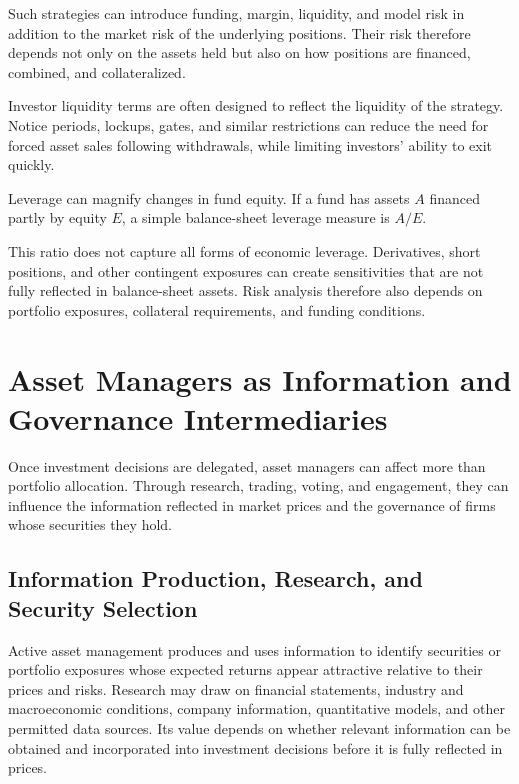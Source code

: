 Such strategies can introduce funding, margin, liquidity, and model risk in addition to the market risk of the underlying positions. Their risk therefore depends not only on the assets held but also on how positions are financed, combined, and collateralized.

Investor liquidity terms are often designed to reflect the liquidity of the strategy. Notice periods, lockups, gates, and similar restrictions can reduce the need for forced asset sales following withdrawals, while limiting investors' ability to exit quickly.

Leverage can magnify changes in fund equity. If a fund has assets $A$ financed partly by equity $E$, a simple balance-sheet leverage measure is $A/E$.

This ratio does not capture all forms of economic leverage. Derivatives, short positions, and other contingent exposures can create sensitivities that are not fully reflected in balance-sheet assets. Risk analysis therefore also depends on portfolio exposures, collateral requirements, and funding conditions.

\section[Asset Managers as Information and Governance Intermediaries]{Asset Managers as Information and\\ Governance Intermediaries}

Once investment decisions are delegated, asset managers can affect more than portfolio allocation. Through research, trading, voting, and engagement, they can influence the information reflected in market prices and the governance of firms whose securities they hold.

\subsection{Information Production, Research, and Security Selection}

Active asset management produces and uses information to identify securities or portfolio exposures whose expected returns appear attractive relative to their prices and risks. Research may draw on financial statements, industry and macroeconomic conditions, company information, quantitative models, and other permitted data sources. Its value depends on whether relevant information can be obtained and incorporated into investment decisions before it is fully reflected in prices.

